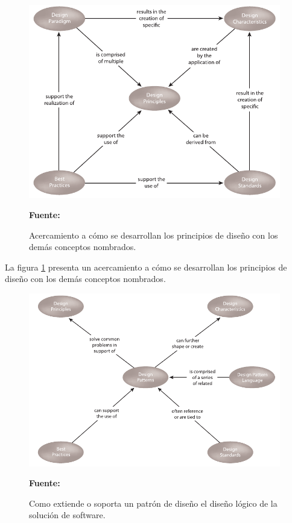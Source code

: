 \begin{figure}[!htb]
  \begin{center}
    \includegraphics[width=11cm]{./imagenes/1.png}
    \caption{Acercamiento a cómo se desarrollan los principios de diseño con los demás conceptos nombrados.}
    \label{fig:uno}
    \textbf{Fuente:}  \cite{soa_principles}
  \end{center}
\end{figure}

La figura \ref{fig:uno} presenta un acercamiento a cómo se desarrollan los principios de diseño con los demás conceptos nombrados.

\begin{figure}[!htb]
  \begin{center}
    \includegraphics[width=11cm]{./imagenes/2.png}
    \caption{Como extiende o soporta un patrón de diseño el diseño lógico de la solución de software.}
    \label{fig:dos}
    \textbf{Fuente:}  \cite{soa_principles}
  \end{center}
\end{figure}

